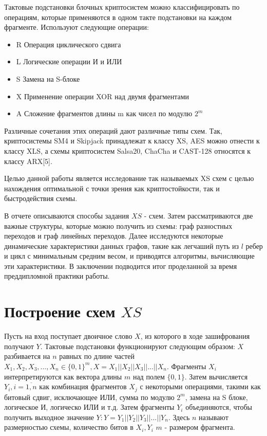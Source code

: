 \documentclass[a4paper,12pt]{extarticle}
\theoremstyle{plain} %
\begin{document}
\begin{large}
Тактовые подстановки блочных криптосистем можно классифицировать по операциям, которые применяются в одном такте подстановки на каждом фрагменте. Используют следующие операции:

\begin{itemize}
\item R
\newline Операция циклического сдвига
\item L
\newline Логические операции И и ИЛИ
\item S
\newline Замена на S-блоке
\item X
\newline Применение операции XOR над двумя фрагментами
\item A
\newline Сложение фрагментов длины m как чисел по модулю $2^m$
\end{itemize}

Различные сочетания этих операций дают различные типы схем. Так, криптосистемы SM4 и Skipjack принадлежат к классу XS, AES можно отнести к классу XLS, а схемы криптосистем Salsa20, ChaCha и CAST-128 относятся к классу ARX[5].

Целью данной работы является исследование так называемых XS схем с целью нахождения оптимальной с точки зрения как криптостойкости, так и быстродействия схемы.

В отчете описываются способы задания $XS$ - схем. Затем рассматриваются две важные структуры, которые можно получить из схемы: граф разностных переходов и граф линейных переходов. Далее исследуются некоторые динамические характеристики данных графов, такие как легчаший путь из $l$ ребер и цикл с минимальным средним весом, и приводятся алгоритмы, вычисляющие эти характеристики. В заключении подводится итог проделанной за время преддипломной практики работы.


\newpage
\section{Построение схем $XS$}
\vspace*{1cm}

Пусть на вход поступает двоичное слово $X$, из которого в ходе зашифрования получают $Y$. Тактовые подстановки функционируют следующим образом: $X$ разбивается на $n$ равных по длине частей $X_1, X_2, X_3, ..., X_n \in \{0, 1\}^m, X = X_1||X_2||X_3||...||X_n$. Фрагменты $X_i$ интерпретируются как вектора длины $m$ над полем $\{0, 1\}$. Затем вычисляется $Y_i, i = \overline{1,n}$ как комбинация фрагментов $X_j$ с некоторыми операциями, такими как битовый сдвиг, исключающее ИЛИ, сумма по модулю $2^m$, замена на S блоке, логическое И, логическо ИЛИ и т.д. Затем фрагменты $Y_i$ объединяются, чтобы получить выходное значение $Y: Y = Y_1||Y_2||Y_3||...||Y_n$. Здесь $n$ называют размерностью схемы, количество битов в $X_i, Y_i$ $m$ - размером фрагмента.


\end{large}
\end{document}
